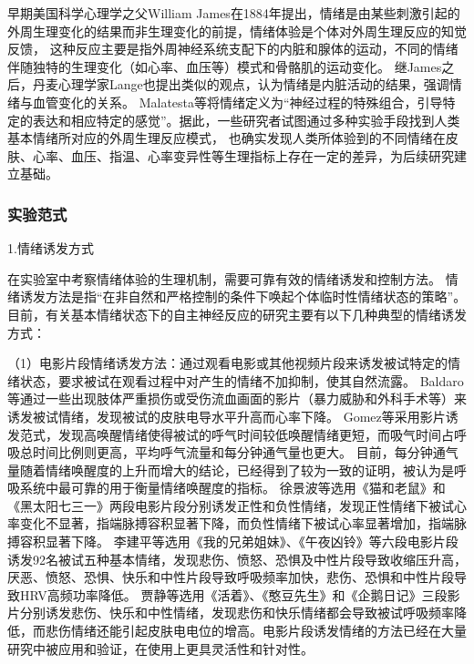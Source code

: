 早期美国科学心理学之父William James\cite{James1884}在1884年提出，情绪是由某些刺激引起的外周生理变化的结果而非生理变化的前提，情绪体验是个体对外周生理反应的知觉反馈，
这种反应主要是指外周神经系统支配下的内脏和腺体的运动，不同的情绪伴随独特的生理变化（如心率、血压等）模式和骨骼肌的运动变化。
继James之后，丹麦心理学家Lange也提出类似的观点，认为情绪是内脏活动的结果，强调情绪与血管变化的关系。
Malatesta等\cite{Malatesta1987}将情绪定义为“神经过程的特殊组合，引导特定的表达和相应特定的感觉”。据此，一些研究者试图通过多种实验手段找到人类基本情绪所对应的外周生理反应模式，
也确实发现人类所体验到的不同情绪在皮肤、心率、血压、指温、心率变异性等生理指标上存在一定的差异\cite{Kreibig2010}，为后续研究建立基础。

\subsubsection{实验范式}

1.情绪诱发方式

在实验室中考察情绪体验的生理机制，需要可靠有效的情绪诱发和控制方法。
情绪诱发方法是指“在非自然和严格控制的条件下唤起个体临时性情绪状态的策略”\cite{Banos2006}。
目前，有关基本情绪状态下的自主神经反应的研究主要有以下几种典型的情绪诱发方式：

    
（1）电影片段情绪诱发方法：通过观看电影或其他视频片段来诱发被试特定的情绪状态，要求被试在观看过程中对产生的情绪不加抑制，使其自然流露。
Baldaro等\cite{Baldaro2002}通过一些出现肢体严重损伤或受伤流血画面的影片（暴力威胁和外科手术等）来诱发被试情绪，发现被试的皮肤电导水平升高而心率下降。
Gomez等\cite{Gomez2005}采用影片诱发范式，发现高唤醒情绪使得被试的呼气时间较低唤醒情绪更短，而吸气时间占呼吸总时间比例则更高，平均呼气流量和每分钟通气量也更大。
目前，每分钟通气量随着情绪唤醒度的上升而增大的结论，已经得到了较为一致的证明，被认为是呼吸系统中最可靠的用于衡量情绪唤醒度的指标。
徐景波等\cite{XuJingbo1995}选用《猫和老鼠》和《黑太阳七三一》两段电影片段分别诱发正性和负性情绪，发现正性情绪下被试心率变化不显著，指端脉搏容积显著下降，而负性情绪下被试心率显著增加，指端脉搏容积显著下降。
李建平等\cite{LiJianping2006}选用《我的兄弟姐妹》、《午夜凶铃》等六段电影片段诱发92名被试五种基本情绪，发现悲伤、愤怒、恐惧及中性片段导致收缩压升高，厌恶、愤怒、恐惧、快乐和中性片段导致呼吸频率加快，悲伤、恐惧和中性片段导致HRV高频功率降低。
贾静等\cite{JiaJing2008}选用《活着》、《憨豆先生》和《企鹅日记》三段影片分别诱发悲伤、快乐和中性情绪，发现悲伤和快乐情绪都会导致被试呼吸频率降低，而悲伤情绪还能引起皮肤电电位的增高。电影片段诱发情绪的方法已经在大量研究中被应用和验证，在使用上更具灵活性和针对性。

